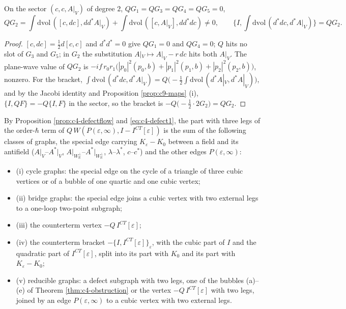 \begin{lemma}
\label{lem:c9-QG}
On the sector $(c,c,A|_V)$ of degree $2$, $QG_1=QG_3=QG_4=QG_5=0$,
\[
QG_2=\int\mathrm{dvol}\,([c,dc],dd^*A|_V)+\int\mathrm{dvol}\,([c,A|_V],dd^*dc)\neq0,\qquad \Big\{I,\int\mathrm{dvol}\,(d^*dc,d^*A|_V)\Big\}=QG_2 .
\]
\end{lemma}

\begin{proof}
$[c,dc]=\tfrac12d[c,c]$ and $d^*d^*=0$ give $QG_1=0$ and $QG_4=0$; $Q$ hits no slot of $G_3$ and $G_5$; in $G_2$ the substitution $A|_V\mapsto A|_V-r\,dc$ hits both $A|_V$. The plane-wave value of $QG_2$ is $-if\,r_0r_1\big(|p_0|^2(p_0,b)+|p_1|^2(p_1,b)+|p_2|^2(p_2,b)\big)$, nonzero. For the bracket, $\int\mathrm{dvol}\,(d^*dc,d^*A|_V)=Q\big(-\tfrac12\int\mathrm{dvol}\,(d^*A|_V,d^*A|_V)\big)$, and by the Jacobi identity and Proposition \ref{prop:c9-maps} (i), $\{I,QF\}=-Q\{I,F\}$ in the sector, so the bracket is $-Q\big(-\tfrac12\cdot2G_2\big)=QG_2$.
\end{proof}

\begin{proposition}
\label{prop:c9-classes}
By Proposition \ref{prop:c4-defectflow} and \eqref{eq:c4-defect1}, the part with three legs of the order-$\hbar$ term of $Q\,W(P(\varepsilon,\infty),I-I^{CT}[\varepsilon])$ is the sum of the following classes of graphs, the special edge carrying $K_\varepsilon-K_0$ between a field and its antifield ($A|_V$--$A^*|_V$, $A|_{W_{\mathbb R}^\perp}$--$A^*|_{W_{\mathbb R}^\perp}$, $\lambda$--$\lambda^*$, $c$--$c^*$) and the other edges $P(\varepsilon,\infty)$:
\begin{itemize}
\item (i) cycle graphs: the special edge on the cycle of a triangle of three cubic vertices or of a bubble of one quartic and one cubic vertex;
\item (ii) bridge graphs: the special edge joins a cubic vertex with two external legs to a one-loop two-point subgraph;
\item (iii) the counterterm vertex $-Q\,I^{CT}[\varepsilon]$;
\item (iv) the counterterm bracket $-\{I,I^{CT}[\varepsilon]\}_\varepsilon$, with the cubic part of $I$ and the quadratic part of $I^{CT}[\varepsilon]$, split into its part with $K_0$ and its part with $K_\varepsilon-K_0$;
\item (v) reducible graphs: a defect subgraph with two legs, one of the bubbles (a)--(e) of Theorem \ref{thm:c4-obstruction} or the vertex $-Q\,I^{CT}[\varepsilon]$ with two legs, joined by an edge $P(\varepsilon,\infty)$ to a cubic vertex with two external legs.
\end{itemize}
\end{proposition}

